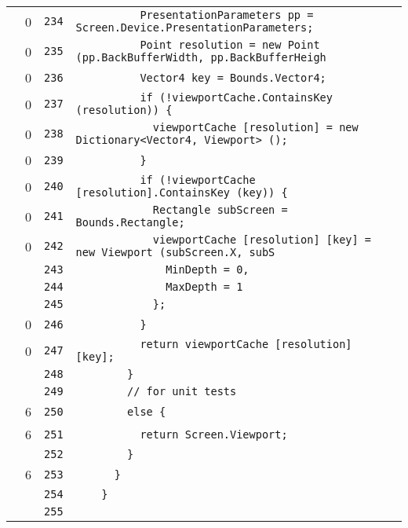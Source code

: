 \documentclass[a4paper,10pt]{article}
\begin{document}
\begin{longtable}[l]{lrrl}
\cellcolor{red} & 0 & \verb~234~ & \verb~          PresentationParameters pp = Screen.Device.PresentationParameters;~\\
\cellcolor{red} & 0 & \verb~235~ & \verb~          Point resolution = new Point (pp.BackBufferWidth, pp.BackBufferHeigh~\\
\cellcolor{red} & 0 & \verb~236~ & \verb~          Vector4 key = Bounds.Vector4;~\\
\cellcolor{red} & 0 & \verb~237~ & \verb~          if (!viewportCache.ContainsKey (resolution)) {~\\
\cellcolor{red} & 0 & \verb~238~ & \verb~            viewportCache [resolution] = new Dictionary<Vector4, Viewport> ();~\\
\cellcolor{red} & 0 & \verb~239~ & \verb~          }~\\
\cellcolor{red} & 0 & \verb~240~ & \verb~          if (!viewportCache [resolution].ContainsKey (key)) {~\\
\cellcolor{red} & 0 & \verb~241~ & \verb~            Rectangle subScreen = Bounds.Rectangle;~\\
\cellcolor{red} & 0 & \verb~242~ & \verb~            viewportCache [resolution] [key] = new Viewport (subScreen.X, subS~\\
\cellcolor{gray} &  & \verb~243~ & \verb~              MinDepth = 0,~\\
\cellcolor{gray} &  & \verb~244~ & \verb~              MaxDepth = 1~\\
\cellcolor{gray} &  & \verb~245~ & \verb~            };~\\
\cellcolor{red} & 0 & \verb~246~ & \verb~          }~\\
\cellcolor{red} & 0 & \verb~247~ & \verb~          return viewportCache [resolution] [key];~\\
\cellcolor{gray} &  & \verb~248~ & \verb~        }~\\
\cellcolor{gray} &  & \verb~249~ & \verb~        // for unit tests~\\
\cellcolor{green} & 6 & \verb~250~ & \verb~        else {~\\
\cellcolor{green} & 6 & \verb~251~ & \verb~          return Screen.Viewport;~\\
\cellcolor{gray} &  & \verb~252~ & \verb~        }~\\
\cellcolor{green} & 6 & \verb~253~ & \verb~      }~\\
\cellcolor{gray} &  & \verb~254~ & \verb~    }~\\
\cellcolor{gray} &  & \verb~255~ & \verb~~\\

\end{longtable}
\end{document}
